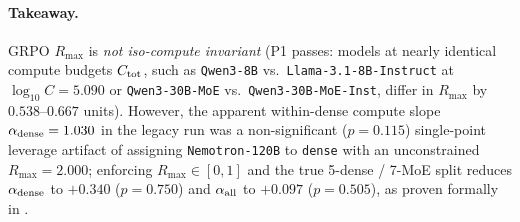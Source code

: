 \paragraph{Takeaway.}
 GRPO $R_{\max}$ is \emph{not iso-compute invariant} (P1 passes: models at nearly identical compute budgets $C_{\rm tot}$, such as \texttt{Qwen3-8B} vs.\ \texttt{Llama-3.1-8B-Instruct} at $\log_{10} C = 5.090$ or \texttt{Qwen3-30B-MoE} vs.\ \texttt{Qwen3-30B-MoE-Inst}, differ in $R_{\max}$ by $0.538$--$0.667$ units). However, the apparent within-dense compute slope $\alpha_{\rm dense}=1.030$ in the legacy run was a non-significant ($p=0.115$) single-point leverage artifact of assigning \texttt{Nemotron-120B} to \texttt{dense} with an unconstrained $R_{\max}=2.000$; enforcing $R_{\max} \in [0,1]$ and the true 5-dense / 7-MoE split reduces $\alpha_{\rm dense}$ to $+0.340$ ($p=0.750$) and $\alpha_{\rm all}$ to $+0.097$ ($p=0.505$), as proven formally in .
